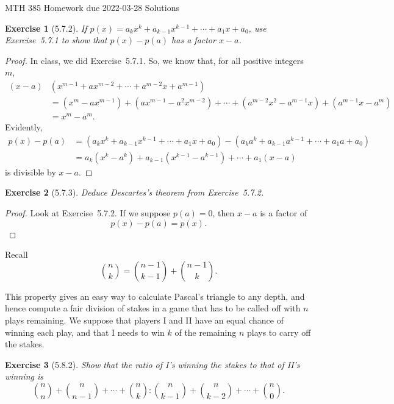 \documentclass[12pt]{article}
\theoremstyle{plain}
\newtheorem{ex}{Exercise}
\begin{document}
MTH 385 \qquad Homework due 2022-03-28 Solutions

\begin{ex} [5.7.2]
  If $p(x)=a_kx^k+a_{k-1}x^{k-1}+\cdots+a_1x+a_0$, use Exercise~5.7.1 to show that $p(x)-p(a)$ has a factor $x-a$.
\end{ex}

\begin{proof}
  In class, we did Exercise~5.7.1. So, we know that, for all positive integers $m$,
  \begin{align*}
    (x-a) & (x^{m-1}+ax^{m-2}+\cdots+a^{m-2}x+a^{m-1}) \\
      &= (x^m-ax^{m-1})+(ax^{m-1}-a^2x^{m-2})+\cdots+(a^{m-2}x^2-a^{m-1}x)+(a^{m-1}x-a^m) \\
      &= x^m-a^m.
  \end{align*}
  Evidently,
  \begin{align*}
    p(x)-p(a) &= (a_kx^k+a_{k-1}x^{k-1}+\cdots+a_1x+a_0)-(a_ka^k+a_{k-1}a^{k-1}+\cdots+a_1a+a_0) \\
              &= a_k(x^k-a^k)+a_{k-1}(x^{k-1}-a^{k-1})+\cdots+a_1(x-a)
  \end{align*}
  is divisible by $x-a$.
\end{proof}

\begin{ex} [5.7.3]
  Deduce Descartes's theorem from Exercise~5.7.2.
\end{ex}

\begin{proof}
  Look at Exercise~5.7.2. If we suppose $p(a)=0$, then $x-a$ is a factor of
  \[
    p(x)-p(a)=p(x).
  \]
\end{proof}

Recall
\[
  \binom{n}{k}=\binom{n-1}{k-1}+\binom{n-1}{k}.
\]

This property gives an easy way to calculate Pascal's triangle to any depth, and hence compute a fair division of stakes in a game that has to be called off with $n$ plays remaining. We suppose that players I and II have an equal chance of winning each play, and that I needs to win $k$ of the remaining $n$ plays to carry off the stakes.

\begin{ex} [5.8.2]
  Show that the ratio of I's winning the stakes to that of II's winning is
  \[
    \binom{n}{n}+\binom{n}{n-1}+\cdots+\binom{n}{k}:\binom{n}{k-1}+\binom{n}{k-2}+\cdots+\binom{n}{0}.
  \]
\end{ex}
\end{document}
